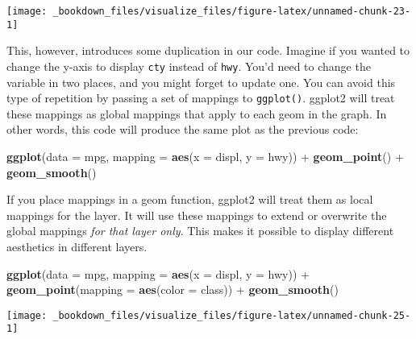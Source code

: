 \documentclass[]{book}
\newenvironment{Shaded}{\begin{snugshade}}{\end{snugshade}}
\newcommand{\KeywordTok}[1]{\textcolor[rgb]{0.13,0.29,0.53}{\textbf{{#1}}}}
\newcommand{\DataTypeTok}[1]{\textcolor[rgb]{0.13,0.29,0.53}{{#1}}}
\newcommand{\StringTok}[1]{\textcolor[rgb]{0.31,0.60,0.02}{{#1}}}
\newcommand{\NormalTok}[1]{{#1}}
\begin{document}
\begin{center}\texttt{[image: \_bookdown\_files/visualize\_files/figure-latex/unnamed-chunk-23-1]} \end{center}

This, however, introduces some duplication in our code. Imagine if you
wanted to change the y-axis to display \texttt{cty} instead of
\texttt{hwy}. You'd need to change the variable in two places, and you
might forget to update one. You can avoid this type of repetition by
passing a set of mappings to \texttt{ggplot()}. ggplot2 will treat these
mappings as global mappings that apply to each geom in the graph. In
other words, this code will produce the same plot as the previous code:

\begin{Shaded}
\begin{Highlighting}[]
\KeywordTok{ggplot}\NormalTok{(}\DataTypeTok{data =} \NormalTok{mpg, }\DataTypeTok{mapping =} \KeywordTok{aes}\NormalTok{(}\DataTypeTok{x =} \NormalTok{displ, }\DataTypeTok{y =} \NormalTok{hwy)) +}\StringTok{ }
\StringTok{  }\KeywordTok{geom_point}\NormalTok{() +}\StringTok{ }
\StringTok{  }\KeywordTok{geom_smooth}\NormalTok{()}
\end{Highlighting}
\end{Shaded}

If you place mappings in a geom function, ggplot2 will treat them as
local mappings for the layer. It will use these mappings to extend or
overwrite the global mappings \emph{for that layer only}. This makes it
possible to display different aesthetics in different layers.

\begin{Shaded}
\begin{Highlighting}[]
\KeywordTok{ggplot}\NormalTok{(}\DataTypeTok{data =} \NormalTok{mpg, }\DataTypeTok{mapping =} \KeywordTok{aes}\NormalTok{(}\DataTypeTok{x =} \NormalTok{displ, }\DataTypeTok{y =} \NormalTok{hwy)) +}\StringTok{ }
\StringTok{  }\KeywordTok{geom_point}\NormalTok{(}\DataTypeTok{mapping =} \KeywordTok{aes}\NormalTok{(}\DataTypeTok{color =} \NormalTok{class)) +}\StringTok{ }
\StringTok{  }\KeywordTok{geom_smooth}\NormalTok{()}
\end{Highlighting}
\end{Shaded}

\begin{center}\texttt{[image: \_bookdown\_files/visualize\_files/figure-latex/unnamed-chunk-25-1]} \end{center}
\end{document}
